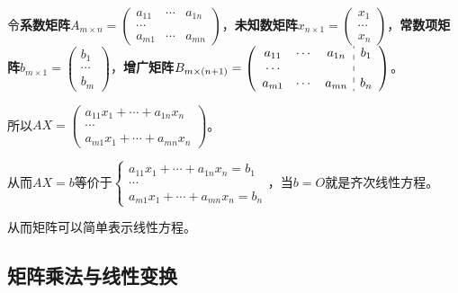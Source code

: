 \documentclass[UTF8, 12pt]{ctexart}
\begin{document}
令\textbf{系数矩阵}$A_{m\times n}=\left(
    \begin{array}{ccc}
        a_{11} & \cdots & a_{1n} \\
        \cdots \\
        a_{m1} & \cdots & a_{mn}
    \end{array}
\right)$，\textbf{未知数矩阵}$x_{n\times 1}=\left(
    \begin{array}{c}
        x_1 \\
        \cdots \\
        x_n
    \end{array}
\right)$，\textbf{常数项矩阵}$b_{m\times 1}=\left(
    \begin{array}{c}
        b_1 \\
        \cdots \\
        b_m
    \end{array}
\right)$，\textbf{增广矩阵}$B_{m\times(n+1)}=\left(
    \begin{array}{c:c}
        \begin{matrix}
            a_{11} & \cdots & a_{1n}\\
            \cdots \\
            a_{m1} & \cdots & a_{mn}
        \end{matrix}&
        \begin{matrix}
            b_1\\
            \\
            b_n
        \end{matrix}
    \end{array}
\right)$。

所以$AX=\left(
    \begin{array}{c}
        a_11x_1+\cdots+a_{1n}x_n \\
        \cdots \\
        a_{m1}x_1+\cdots+a_{mn}x_n
    \end{array}
\right)$。

从而$AX=b$等价于$\begin{cases}
    a_{11}x_1+\cdots+a_{1n}x_n=b_1 \\
    \cdots \\
    a_{m1}x_1+\cdots+a_{mn}x_n=b_n
\end{cases}$，当$b=O$就是齐次线性方程。

从而矩阵可以简单表示线性方程。

\subsection{矩阵乘法与线性变换}
\end{document}
